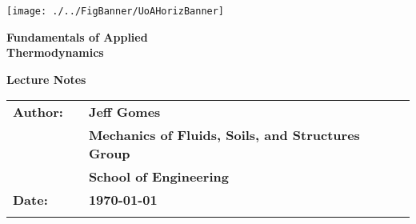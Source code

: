 \documentclass[11pts,a4paper,amsmath,amssymb,floatfix]{book}
\theoremstyle{definition}
\begin{document}
\let\cleardoublepage\clearpage

\vspace{4cm}

\begin{titlepage}
  \vspace{3.5cm}

            \texttt{[image: ./../FigBanner/UoAHorizBanner]}

  \begin{center}

     \vspace{4.5cm}

     {\bf{\Huge Fundamentals of Applied }} \\
        \vspace{.5cm}
     {\bf{\Huge Thermodynamics }}
   
     \vspace{4cm}

     {\bf{\huge Lecture Notes}}

     \vspace{5.5cm}

  \end{center}

  \begin{tabular}{l c l}
    {\bf{\Large Author:}}           &     &    {\Large{\bf Jeff Gomes}} \\
                                    &     &    {\Large{\bf Mechanics of Fluids, Soils, and Structures Group}} \\
                                    &     &    {\Large{\bf School of Engineering}} \\
    \bigskip
    {\bf{\Large Date:}}             &     &    {\Large{\bf \today}}\\
                                    &     &         \\
  \end{tabular}
\end{titlepage}

\end{document}
